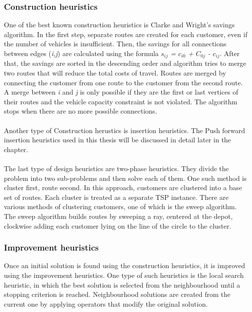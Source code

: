 \documentclass[a4paper,twoside,12pt]{book}
\begin{document}
\subsubsection{Construction heuristics}
One of the best known construction heuristics is Clarke and Wright's savings algorithm. In the first step, separate routes are created for each customer, even if the number of vehicles is insufficient. Then, the  savings for all connections between edges (\textit{i,j}) are calculated using the formula \textit{$s_{ij}$ = $c_{i0}$ + $C_{0j}$ - $c_{ij}$}. After that, the savings are sorted in the descending order and algorithm tries to merge two routes that will reduce the total costs of travel. Routes are merged by connecting the customer from one route to the customer from the second route. A merge between \textit{i} and \textit{j} is only possible if they are the first or last vertices of their routes and the vehicle capacity constraint is not violated. The algorithm stops when there are no more possible connections.
\paragraph{}
Another type of Construction herustics is insertion heuristics. The Push forward insertion heuristics used in this thesis will be discussed in detail later in the chapter.
\paragraph{}
The last type of design heuristics are two-phase heuristics. They divide the problem into two sub-problems and then solve each of them. One such method is cluster first, route second. In this approach, customers are clustered into a base set of routes. Each cluster is treated as a separate TSP instance. There are various methods of clustering customers, one of which is the sweep algorithm. The sweep algorithm builds routes by sweeping a ray, centered at the depot, clockwise adding each customer lying on the line of the circle to the cluster.
\subsubsection{Improvement heuristics}
Once an initial solution is found using the construction heuristics, it is improved using the improvement heuristics. One type of such heuristics is the local search heuristic, in which the best solution is selected from the neighbourhood until a stopping criterion is reached. Neighbourhood solutions are created from the current one by applying operators that modify the original solution. 
\end{document}
